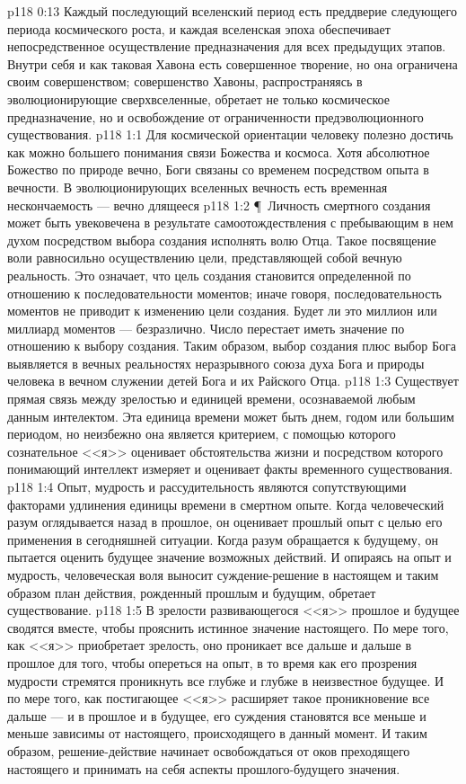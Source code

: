 \vs p118 0:13 Каждый последующий вселенский период есть преддверие следующего периода космического роста, и каждая вселенская эпоха обеспечивает непосредственное осуществление предназначения для всех предыдущих этапов. Внутри себя и как таковая Хавона есть совершенное творение, но она ограничена своим совершенством; совершенство Хавоны, распространяясь в эволюционирующие сверхвселенные, обретает не только космическое предназначение, но и освобождение от ограниченности предэволюционного существования.
\vs p118 1:1 Для космической ориентации человеку полезно достичь как можно большего понимания связи Божества и космоса. Хотя абсолютное Божество по природе вечно, Боги связаны со временем посредством опыта в вечности. В эволюционирующих вселенных вечность есть временная нескончаемость --- вечно длящееся 
\vs p118 1:2 \P\ Личность смертного создания может быть увековечена в результате самоотождествления с пребывающим в нем духом посредством выбора создания исполнять волю Отца. Такое посвящение воли равносильно осуществлению цели, представляющей собой вечную реальность. Это означает, что цель создания становится определенной по отношению к последовательности моментов; иначе говоря, последовательность моментов не приводит к изменению цели создания. Будет ли это миллион или миллиард моментов --- безразлично. Число перестает иметь значение по отношению к выбору создания. Таким образом, выбор создания плюс выбор Бога выявляется в вечных реальностях неразрывного союза духа Бога и природы человека в вечном служении детей Бога и их Райского Отца.
\vs p118 1:3 Существует прямая связь между зрелостью и единицей времени, осознаваемой любым данным интелектом. Эта единица времени может быть днем, годом или большим периодом, но неизбежно она является критерием, с помощью которого сознательное <<я>> оценивает обстоятельства жизни и посредством которого понимающий интеллект измеряет и оценивает факты временного существования.
\vs p118 1:4 Опыт, мудрость и рассудительность являются сопутствующими факторами удлинения единицы времени в смертном опыте. Когда человеческий разум оглядывается назад в прошлое, он оценивает прошлый опыт с целью его применения в сегодняшней ситуации. Когда разум обращается к будущему, он пытается оценить будущее значение возможных действий. И опираясь на опыт и мудрость, человеческая воля выносит суждение\hyp{}решение в настоящем и таким образом план действия, рожденный прошлым и будущим, обретает существование.
\vs p118 1:5 В зрелости развивающегося <<я>> прошлое и будущее сводятся вместе, чтобы прояснить истинное значение настоящего. По мере того, как <<я>> приобретает зрелость, оно проникает все дальше и дальше в прошлое для того, чтобы опереться на опыт, в то время как его прозрения мудрости стремятся проникнуть все глубже и глубже в неизвестное будущее. И по мере того, как постигающее <<я>> расширяет такое проникновение все дальше --- и в прошлое и в будущее, его суждения становятся все меньше и меньше зависимы от настоящего, происходящего в данный момент. И таким образом, решение\hyp{}действие начинает освобождаться от оков преходящего настоящего и принимать на себя аспекты прошлого\hyp{}будущего значения.
